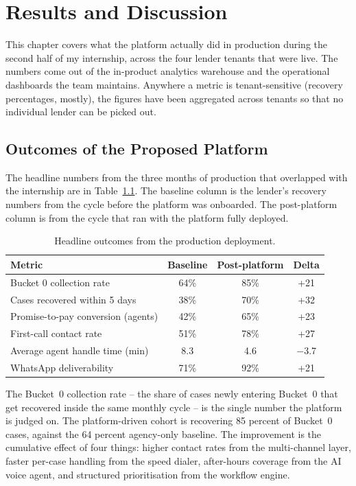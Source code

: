 \chapter{Results and Discussion}
\label{Chapter 5}

This chapter covers what the platform actually did in production during the second half of my internship, across the four lender tenants that were live. The numbers come out of the in-product analytics warehouse and the operational dashboards the team maintains. Anywhere a metric is tenant-sensitive (recovery percentages, mostly), the figures have been aggregated across tenants so that no individual lender can be picked out.

\section{Outcomes of the Proposed Platform}
The headline numbers from the three months of production that overlapped with the internship are in Table~\ref{tab:headline}. The baseline column is the lender's recovery numbers from the cycle before the platform was onboarded. The post-platform column is from the cycle that ran with the platform fully deployed.

\begin{table}[H]
\centering
\caption{Headline outcomes from the production deployment.}
\label{tab:headline}
\begin{tabularx}{\textwidth}{l c c c}
\toprule
\textbf{Metric} & \textbf{Baseline} & \textbf{Post-platform} & \textbf{Delta} \\
\midrule
Bucket 0 collection rate & 64\% & 85\% & +21 \\
Cases recovered within 5 days & 38\% & 70\% & +32 \\
Promise-to-pay conversion (agents) & 42\% & 65\% & +23 \\
First-call contact rate & 51\% & 78\% & +27 \\
Average agent handle time (min) & 8.3 & 4.6 & $-$3.7 \\
WhatsApp deliverability & 71\% & 92\% & +21 \\
\bottomrule
\end{tabularx}
\end{table}

The Bucket~0 collection rate -- the share of cases newly entering Bucket~0 that get recovered inside the same monthly cycle -- is the single number the platform is judged on. The platform-driven cohort is recovering 85 percent of Bucket~0 cases, against the 64 percent agency-only baseline. The improvement is the cumulative effect of four things: higher contact rates from the multi-channel layer, faster per-case handling from the speed dialer, after-hours coverage from the AI voice agent, and structured prioritisation from the workflow engine.

